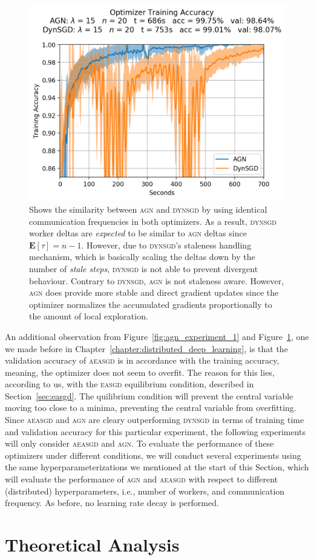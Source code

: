 \begin{figure}[H]
  \centering
  \includegraphics[width=.6\textwidth]{resources/images/agn_experiment_3}
  \caption{Shows the similarity between \textsc{agn} and \textsc{dynsgd} by using identical communication frequencies in both optimizers. As a result, \textsc{dynsgd} worker deltas are \emph{expected} to be similar to \textsc{agn} deltas since $\textbf{E}[\tau] = n - 1$. However, due to \textsc{dynsgd}'s staleness handling mechanism, which is basically scaling the deltas down by the number of \emph{stale steps}, \textsc{dynsgd} is not able to prevent divergent behaviour. Contrary to \textsc{dynsgd}, \textsc{agn} is not staleness aware. However, \textsc{agn} does provide more stable and direct gradient updates since the optimizer normalizes the accumulated gradients proportionally to the amount of local exploration.}
  \label{fig:agn_experiment_2}
\end{figure}

An additional observation from Figure~\ref{fig:agn_experiment_1} and Figure~\ref{fig:agn_experiment_2}, one we made before in Chapter~\ref{chapter:distributed_deep_learning}, is that the validation accuracy of \textsc{aeasgd} is in accordance with the training accuracy, meaning, the optimizer does not seem to overfit. The reason for this lies, according to us, with the \textsc{easgd} equilibrium condition, described in Section~\ref{sec:easgd}. The quilibrium condition will prevent the central variable moving too close to a minima, preventing the central variable from overfitting.\\

Since \textsc{aeasgd} and \textsc{agn} are cleary outperforming \textsc{dynsgd} in terms of training time and validation accuracy for this particular experiment, the following experiments will only consider \textsc{aeasgd} and \textsc{agn}. To evaluate the performance of these optimizers under different conditions, we will conduct several experiments using the same hyperparameterizations we mentioned at the start of this Section, which will evaluate the performance of \textsc{agn} and \textsc{aeasgd} with respect to different (distributed) hyperparameters, i.e., number of workers, and communication frequency. As before, no learning rate decay is performed.

\section{Theoretical Analysis}
\label{sec:agn_theoretical_analysis}
